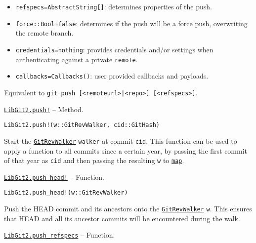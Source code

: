 \begin{adjustwidth}{2em}{0pt}
\begin{itemize}
\item \texttt{refspecs=AbstractString[]}: determines properties of the push.


\item \texttt{force::Bool=false}: determines if the push will be a force push,  overwriting the remote branch.


\item \texttt{credentials=nothing}: provides credentials and/or settings when authenticating against  a private \texttt{remote}.


\item \texttt{callbacks=Callbacks()}: user provided callbacks and payloads.

\end{itemize}
Equivalent to \texttt{git push [<remoteurl>|<repo>] [<refspecs>]}.



\end{adjustwidth}
\hypertarget{1094911863830060497}{} 
\hyperlink{1094911863830060497}{\texttt{LibGit2.push!}}  -- {Method.}

\begin{adjustwidth}{2em}{0pt}


\begin{verbatim}
LibGit2.push!(w::GitRevWalker, cid::GitHash)
\end{verbatim}

Start the \hyperlink{7800294839307043628}{\texttt{GitRevWalker}} \texttt{walker} at commit \texttt{cid}. This function can be used to apply a function to all commits since a certain year, by passing the first commit of that year as \texttt{cid} and then passing the resulting \texttt{w} to \hyperlink{546421066875217314}{\texttt{map}}.



\end{adjustwidth}
\hypertarget{9792433728015067335}{} 
\hyperlink{9792433728015067335}{\texttt{LibGit2.push\_head!}}  -- {Function.}

\begin{adjustwidth}{2em}{0pt}


\begin{verbatim}
LibGit2.push_head!(w::GitRevWalker)
\end{verbatim}

Push the HEAD commit and its ancestors onto the \hyperlink{7800294839307043628}{\texttt{GitRevWalker}} \texttt{w}. This ensures that HEAD and all its ancestor commits will be encountered during the walk.



\end{adjustwidth}
\hypertarget{13692255696673908343}{} 
\hyperlink{13692255696673908343}{\texttt{LibGit2.push\_refspecs}}  -- {Function.}

